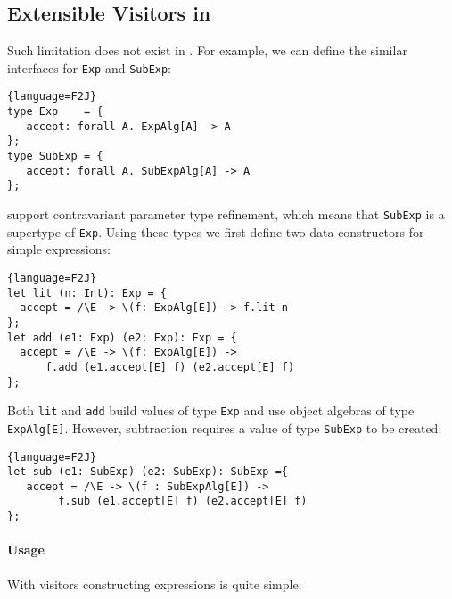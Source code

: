 \begin{comment}
However,
such subtyping relation does not fit well in Scala because inheritance implies
subtyping in such languages \footnote{It is still possible to encode
  contravariant parameter types in Scala but doing so would require some
  technique.\bruno{what technique?}}. As \lstinline{SubExp[E]} extends
\lstinline{Exp[E]}, the former becomes a subtype of the latter. This suffers
from the ``Inheritance is Not Subtyping'' problem.
\end{comment}

\subsection{Extensible Visitors in \name}
Such limitation does not exist in \name. For example, we can define the similar
interfaces for \lstinline{Exp} and \lstinline{SubExp}:
\begin{lstlisting}{language=F2J}
type Exp    = {
   accept: forall A. ExpAlg[A] -> A
};
type SubExp = {
   accept: forall A. SubExpAlg[A] -> A
};
\end{lstlisting}
\name support contravariant parameter type refinement, which means that
\lstinline{SubExp} is a supertype of \lstinline{Exp}. Using these
types we first define two data constructors for simple expressions:
\begin{lstlisting}{language=F2J}
let lit (n: Int): Exp = {
  accept = /\E -> \(f: ExpAlg[E]) -> f.lit n
};
let add (e1: Exp) (e2: Exp): Exp = {
  accept = /\E -> \(f: ExpAlg[E]) -> 
      f.add (e1.accept[E] f) (e2.accept[E] f)
};
\end{lstlisting}

\noindent Both \lstinline{lit} and \lstinline{add} build values of type
\lstinline{Exp} and use object algebras of type \lstinline{ExpAlg[E]}. 
However, subtraction requires a value of type \lstinline{SubExp} to be created:
\begin{lstlisting}{language=F2J}
let sub (e1: SubExp) (e2: SubExp): SubExp ={ 
   accept = /\E -> \(f : SubExpAlg[E]) ->
        f.sub (e1.accept[E] f) (e2.accept[E] f) 
};
\end{lstlisting}


\paragraph{Usage} With visitors constructing expressions is quite simple:

